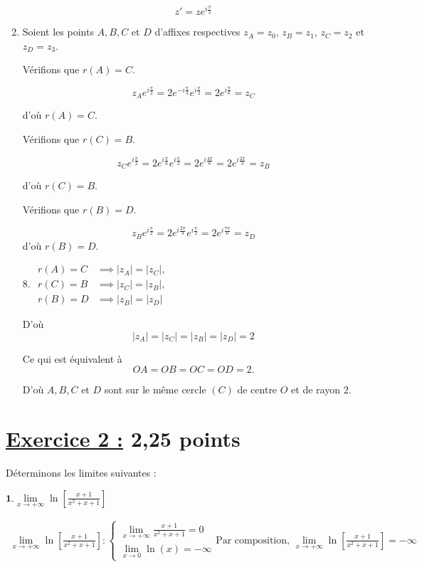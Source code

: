 \documentclass[12pt,a4paper]{article}
\begin{document}
\begin{enumerate}
          \[
              z' = z e^{i \frac{\pi}{2}}
          \]

    \item
          Soient les points $A, B, C$ et $D$ d’affixes respectives $z_A = z_0$, $z_B = z_1$, $z_C = z_2$ et $z_D = z_3$.

          Vérifions que $r(A) = C$.

          \[
              z_A e^{i \frac{\pi}{2}} = 2e^{-i \frac{\pi}{3}} e^{i \frac{\pi}{2}} = 2e^{i \frac{\pi}{6}} = z_C
          \]

          d’où $r(A) = C$.

          Vérifions que $r(C) = B$.

          \[
              z_C e^{i \frac{\pi}{2}} = 2e^{i \frac{\pi}{6}} e^{i \frac{\pi}{2}} = 2e^{i \frac{4\pi}{6}} = 2e^{i \frac{2\pi}{3}} = z_B
          \]

          d’où $r(C) = B$.

          Vérifions que $r(B) = D$.

          \[
              z_B e^{i \frac{\pi}{2}} = 2e^{i \frac{2\pi}{3}} e^{i \frac{\pi}{2}} = 2e^{i \frac{7\pi}{6}} = z_D
          \]
          d’où \( r(B) = D \).

          8. \(
          \begin{aligned}
              r(A) = C & \implies |z_A| = |z_C|, \\
              r(C) = B & \implies |z_C| = |z_B|, \\
              r(B) = D & \implies |z_B| = |z_D|
          \end{aligned}
          \)

          D’où
          \[
              |z_A| = |z_C| = |z_B| = |z_D| = 2
          \]

          Ce qui est équivalent à
          \[
              OA = OB = OC = OD = 2.
          \]

          D’où \( A, B, C \) et \( D \) sont sur le même cercle \( (C) \) de centre \( O \) et de rayon 2.
\end{enumerate}
\section*{\underline{Exercice 2 :} 2,25 points }
Déterminons les limites suivantes :

\(\textbf{1.} \lim\limits_{x \to +\infty} \ln\left[ \frac{x+1}{x^2 + x + 1}\right]  \quad \)

\(
\begin{aligned}
    \lim\limits_{x \to +\infty} \ln\left[ \frac{x+1}{x^2 + x + 1}\right]:
    \begin{cases}
        \lim\limits_{x \to +\infty} \frac{x+1}{x^2 + x + 1}=0 \\
        \lim\limits_{x \to 0}\ln(x)=-\infty
    \end{cases}\text{Par composition, }\lim\limits_{x \to +\infty} \ln\left[ \frac{x+1}{x^2 + x + 1}\right]=-\infty
\end{aligned}
\)
\end{document}
